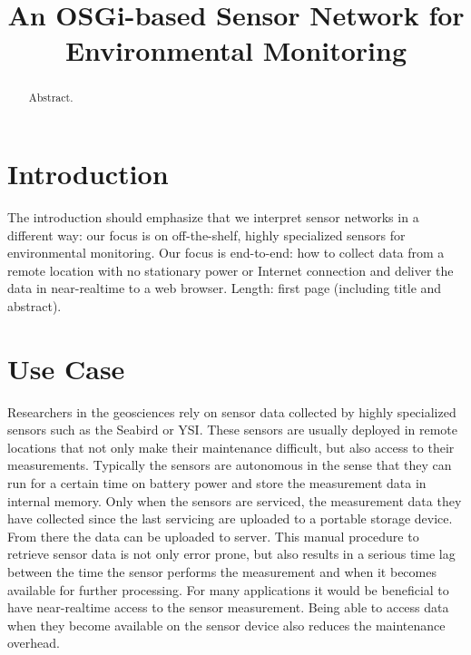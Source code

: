 \documentclass[conference]{IEEEtran}
\begin{document}
\title{An OSGi-based Sensor Network for \\ Environmental Monitoring}

\author{
}


\maketitle
\begin{abstract}
  Abstract.
\end{abstract}


\section{Introduction}

The introduction should emphasize that we interpret sensor networks in
a different way: our focus is on off-the-shelf, highly specialized
sensors for environmental monitoring. Our focus is end-to-end: how to
collect data from a remote location with no stationary power or
Internet connection and deliver the data in near-realtime to a web
browser. Length: first page (including title and abstract).

\section{Use Case}

Researchers in the geosciences rely on sensor data collected by highly
specialized sensors such as the Seabird or YSI. These sensors are
usually deployed in remote locations that not only make their
maintenance difficult, but also access to their measurements.
Typically the sensors are autonomous in the sense that they can run
for a certain time on battery power and store the measurement data in
internal memory. Only when the sensors are serviced, the measurement
data they have collected since the last servicing are uploaded to a
portable storage device. From there the data can be uploaded to
server. This manual procedure to retrieve sensor data is not only
error prone, but also results in a serious time lag between the time
the sensor performs the measurement and when it becomes available for
further processing. For many applications it would be beneficial to
have near-realtime access to the sensor measurement. Being able to
access data when they become available on the sensor device also
reduces the maintenance overhead.
\end{document}
